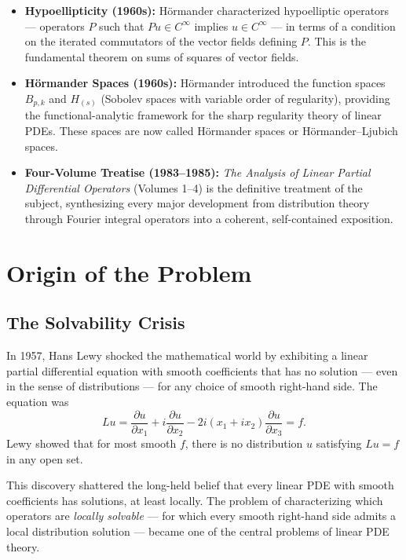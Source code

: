 \begin{itemize}
    equation.
    \item \textbf{Hypoellipticity (1960s):} H\"ormander characterized
    hypoelliptic operators --- operators \(P\) such that \(Pu \in
    C^\infty\) implies \(u \in C^\infty\) --- in terms of a condition on
    the iterated commutators of the vector fields defining \(P\). This
    is the fundamental theorem on sums of squares of vector fields.
    \item \textbf{H\"ormander Spaces (1960s):} H\"ormander introduced
    the function spaces \(B_{p,k}\) and \(H_{(s)}\) (Sobolev spaces with
    variable order of regularity), providing the functional-analytic
    framework for the sharp regularity theory of linear PDEs. These
    spaces are now called H\"ormander spaces or H\"ormander--Ljubich
    spaces.
    \item \textbf{Four-Volume Treatise (1983--1985):} \textit{The
    Analysis of Linear Partial Differential Operators} (Volumes 1--4)
    is the definitive treatment of the subject, synthesizing every major
    development from distribution theory through Fourier integral
    operators into a coherent, self-contained exposition.
\end{itemize}

\section{Origin of the Problem}

\subsection{The Solvability Crisis}

In 1957, Hans Lewy shocked the mathematical world by exhibiting a linear
partial differential equation with smooth coefficients that has no
solution --- even in the sense of distributions --- for any choice of
smooth right-hand side. The equation was
\[
L u = \frac{\partial u}{\partial x_1} + i \frac{\partial u}{\partial x_2}
- 2i(x_1 + i x_2) \frac{\partial u}{\partial x_3} = f.
\]
Lewy showed that for most smooth \(f\), there is no distribution \(u\)
satisfying \(Lu = f\) in any open set.

This discovery shattered the long-held belief that every linear PDE with
smooth coefficients has solutions, at least locally. The problem of
characterizing which operators are \textit{locally solvable} --- for
which every smooth right-hand side admits a local distribution
solution --- became one of the central problems of linear PDE theory.

